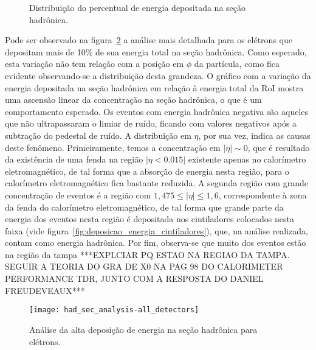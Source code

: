\begin{figure}
\centering 
{}
\caption{Distribuição do percentual de energia depositada na seção hadrônica.} 
\label{fig:energia_secao_hadronica} 
\end{figure} 

Pode ser observado na figura~\ref{fig:analise_secao_hadronica_eletrons} a análise mais detalhada para os elétrons que depositam mais de 10\% de sua energia total na seção hadrônica. Como esperado, esta variação não tem relação com a posição em $\phi$ da partícula, como fica evidente observando-se a distribuição desta grandeza. O gráfico com a variação da energia depositada na seção hadrônica em relação à energia total da RoI mostra uma ascensão linear da concentração na seção hadrônica, o que é um comportamento esperado. Os eventos com energia hadrônica negativa são aqueles que não ultrapassaram o limiar de ruído, ficando com valores negativos após a subtração do pedestal de ruído. A distribuição em $\eta$, por sua vez, indica as causas  deste fenômeno. Primeiramente, temos a concentração em $| \eta | \sim 0$, que é resultado da existência de uma fenda na região $| \eta < 0.015 |$ existente apenas no calorímetro eletromagnético, de tal forma que a absorção de energia nesta região, para o calorímetro eletromagnético fica bastante reduzida. A segunda região com grande concentração de eventos é a região  com $1,475 \leq | \eta | \leq 1,6$, correspondente à zona da fenda do calorímetro eletromagnético, de tal forma que grande parte da energia dos eventos nesta região é depositada nos cintiladores colocados nesta faixa (vide figura~\ref{fig:deposicao_energia_cintiladores}), que, na análise realizada, contam como energia hadrônica. Por fim, observa-se que muito dos eventos estão na região da tampa ***EXPLCIAR PQ ESTAO NA REGIAO DA TAMPA. SEGUIR A TEORIA DO GRA DE X0 NA PAG 98 DO CALORIMETER PERFORMANCE TDR, JUNTO COM A RESPOSTA DO DANIEL FREUDEVEAUX***

\begin{figure}
\centering 
\texttt{[image: had\_sec\_analysis-all\_detectors]}
\caption{Análise da alta deposição de energia na seção hadrônica para elétrons.} 
\label{fig:analise_secao_hadronica_eletrons} 
\end{figure} 


